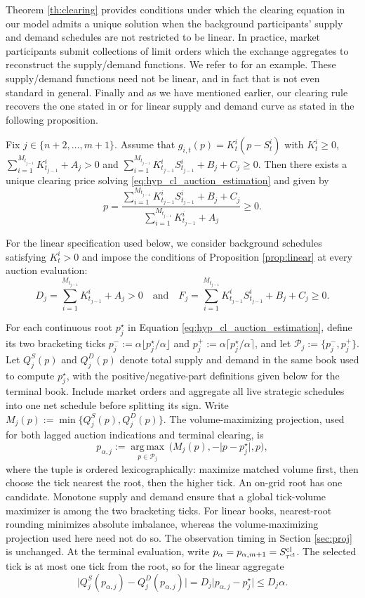 \documentclass[11pt]{article}
\begin{document}
Theorem \ref{th:clearing} provides conditions under which the clearing equation in our model admits a unique solution when the background participants' supply and demand schedules are not restricted to be linear. In practice, market participants submit collections of limit orders which the exchange aggregates to reconstruct the supply/demand functions. We refer to \cite{mastrolia2025optimal} for an example. These supply/demand functions need not be linear, and in fact that is not even standard in general. Finally and as we have mentioned earlier, our clearing rule recovers the one stated in \cite{paul2021optimal} or \cite{mastrolia2025optimal} for linear supply and demand curve as stated in the following proposition. 
\begin{proposition}
\label{prop:linear}
   Fix $j\in\{n+2,\ldots,m+1\}$. Assume that $g_{i,t}(p) = K_t^i(p-S_t^i)$ with $K_t^i \geqslant 0$, $\sum_{i=1}^{M_{t_{j-1}}} K_{t_{j-1}}^i +A_j >0$ and $\sum_{i=1}^{M_{t_{j-1}}} K_{t_{j-1}}^iS_{t_{j-1}}^i +B_j +C_j \geqslant 0$. Then there exists a unique clearing price solving \eqref{eq:hyp_cl_auction_estimation} and given by  
   \[p = \frac{\sum_{i=1}^{M_{t_{j-1}}} K_{t_{j-1}}^iS_{t_{j-1}}^i +B_j +C_j}{\sum_{i=1}^{M_{t_{j-1}}} K_{t_{j-1}}^i +A_j}\geqslant 0.\]
\end{proposition}

For the linear specification used below, we consider background schedules satisfying $K_t^i>0$ and impose the conditions of Proposition \ref{prop:linear} at every auction evaluation:
\[D_j = \sum_{i=1}^{M_{t_{j-1}}} K_{t_{j-1}}^i +A_j > 0 \quad \text{and} \quad F_j = \sum_{i=1}^{M_{t_{j-1}}} K_{t_{j-1}}^iS_{t_{j-1}}^i +B_j +C_j \geqslant 0.\]

\begingroup
For each continuous root $p_j^\star$ in Equation \eqref{eq:hyp_cl_auction_estimation}, define its two bracketing ticks $p_j^-:=\alpha\lfloor p_j^\star/\alpha\rfloor$ and $p_j^+:=\alpha\lceil p_j^\star/\alpha\rceil$, and let $\mathcal P_j:=\{p_j^-,p_j^+\}$. Let $Q_j^S(p)$ and $Q_j^D(p)$ denote total supply and demand in the same book used to compute $p_j^\star$, with the positive/negative-part definitions given below for the terminal book. Include market orders and aggregate all live strategic schedules into one net schedule before splitting its sign. Write $M_j(p):=\min\{Q_j^S(p),Q_j^D(p)\}$. The volume-maximizing projection, used for both lagged auction indications and terminal clearing, is
\[
p_{\alpha,j}:=\underset{p\in\mathcal P_j}{\operatorname{arg\,max}}\,
\bigl(M_j(p),-\lvert p-p_j^\star\rvert,p\bigr),
\]
where the tuple is ordered lexicographically: maximize matched volume first, then choose the tick nearest the root, then the higher tick. An on-grid root has one candidate. Monotone supply and demand ensure that a global tick-volume maximizer is among the two bracketing ticks. For linear books, nearest-root rounding minimizes absolute imbalance, whereas the volume-maximizing projection used here need not do so. The observation timing in Section \ref{sec:proj} is unchanged. At the terminal evaluation, write $p_\alpha=p_{\alpha,m+1}=S_{\tau^{\mathrm{cl}}}^{\mathrm{cl}}$. The selected tick is at most one tick from the root, so for the linear aggregate
\[
\lvert Q_j^S(p_{\alpha,j})-Q_j^D(p_{\alpha,j})\rvert
=D_j\lvert p_{\alpha,j}-p_j^\star\rvert\leq D_j\alpha.
\]
\end{document}
